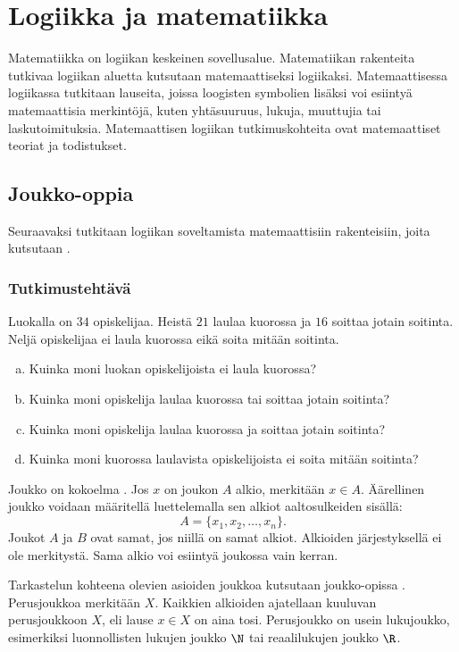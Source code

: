 \chapter{Logiikka ja matematiikka}

Matematiikka on logiikan keskeinen sovellusalue. Matematiikan rakenteita tutkivaa logiikan aluetta kutsutaan matemaattiseksi logiikaksi. Matemaattisessa logiikassa tutkitaan lauseita, joissa loogisten symbolien lisäksi voi esiintyä matemaattisia merkintöjä, kuten yhtäsuuruus, lukuja, muuttujia tai laskutoimituksia. Matemaattisen logiikan tutkimuskohteita ovat matemaattiset teoriat ja todistukset.


\section{Joukko-oppia}%
Seuraavaksi tutkitaan logiikan soveltamista matemaattisiin rakenteisiin, joita kutsutaan .

\subsection*{Tutkimustehtävä}
Luokalla on $34$ opiskelijaa. Heistä $21$ laulaa kuorossa ja $16$ soittaa jotain soitinta. Neljä opiskelijaa ei laula kuorossa eikä soita mitään soitinta.
\begin{enumerate}[a)]
\item Kuinka moni luokan opiskelijoista ei laula kuorossa?
\item Kuinka moni opiskelija laulaa kuorossa tai soittaa jotain soitinta?
\item Kuinka moni opiskelija laulaa kuorossa ja soittaa jotain soitinta?
\item Kuinka moni kuorossa laulavista opiskelijoista ei soita mitään soitinta?
\end{enumerate}

Joukko on kokoelma . Jos $x$ on joukon $A$ alkio, merkitään $x\in A$. Äärellinen joukko voidaan määritellä luettelemalla sen alkiot aaltosulkeiden sisällä:
\[
 A = \{ x_1, x_2, \ldots, x_n\}.
\]
Joukot $A$ ja $B$ ovat samat, jos niillä on samat alkiot. Alkioiden jär\-jes\-tyk\-sel\-lä ei ole merkitystä. Sama alkio voi esiintyä joukossa vain kerran.

Tarkastelun kohteena olevien asioiden joukkoa kutsutaan joukko-opissa . Perusjoukkoa merkitään $X$. Kaikkien alkioiden ajatellaan kuuluvan perusjoukkoon $X$, eli lause $x\in X$ on aina tosi. Perusjoukko on usein lukujoukko, esimerkiksi luonnollisten lukujen joukko $\N$ tai reaalilukujen joukko $\R$.

